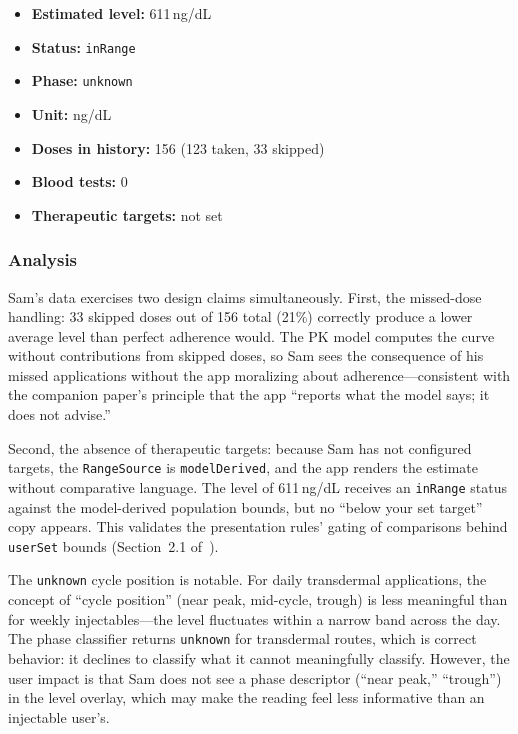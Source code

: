 \documentclass[11pt,a4paper]{article}
\newcommand{\code}[1]{\texttt{\small #1}}
\begin{document}
\begin{itemize}[nosep,leftmargin=1.4em]
\item \textbf{Estimated level:} 611\,ng/dL
\item \textbf{Status:} \code{inRange}
\item \textbf{Phase:} \code{unknown}
\item \textbf{Unit:} ng/dL
\item \textbf{Doses in history:} 156 (123 taken, 33 skipped)
\item \textbf{Blood tests:} 0
\item \textbf{Therapeutic targets:} not set
\end{itemize}

\subsubsection{Analysis}

Sam's data exercises two design claims simultaneously. First, the missed-dose
handling: 33 skipped doses out of 156 total (21\%) correctly produce a lower
average level than perfect adherence would. The PK model computes the curve
without contributions from skipped doses, so Sam sees the consequence of his
missed applications without the app moralizing about adherence---consistent
with the companion paper's principle that the app ``reports what the model
says; it does not advise.''

Second, the absence of therapeutic targets: because Sam has not configured
targets, the \code{RangeSource} is \code{modelDerived}, and the app renders
the estimate without comparative language. The level of 611\,ng/dL receives
an \code{inRange} status against the model-derived population bounds, but no
``below your set target'' copy appears. This validates the presentation
rules' gating of comparisons behind \code{userSet} bounds
(Section~2.1 of~\cite{xtux}).

The \code{unknown} cycle position is notable. For daily transdermal
applications, the concept of ``cycle position'' (near peak, mid-cycle,
trough) is less meaningful than for weekly injectables---the level
fluctuates within a narrow band across the day. The phase classifier returns
\code{unknown} for transdermal routes, which is correct behavior: it
declines to classify what it cannot meaningfully classify. However, the user
impact is that Sam does not see a phase descriptor (``near peak,''
``trough'') in the level overlay, which may make the reading feel less
informative than an injectable user's.
\end{document}
